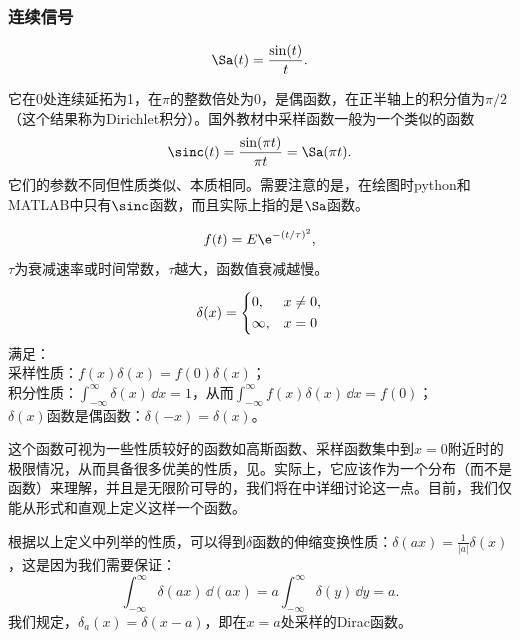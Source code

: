 \subsubsection{连续信号}
\begin{definition}[采样函数]\label{def:sinc}
    \begin{equation}
        \Sa(t)=\frac{\sin(t)}{t}.
    \end{equation}
\end{definition}
它在0处连续延拓为1，在$\pi$的整数倍处为0，是偶函数，在正半轴上的积分值为$\pi /2$（这个结果称为Dirichlet积分）。国外教材中采样函数一般为一个类似的函数
\begin{equation}
    \sinc(t)=\frac{\sin(\pi t)}{\pi t}=\Sa(\pi t).
\end{equation}
它们的参数不同但性质类似、本质相同。需要注意的是，在绘图时python和MATLAB中只有$\sinc$函数，而且实际上指的是$\Sa$函数。
\begin{definition}
    \begin{equation}
        f(t)=E\e^{-(t/\tau)^2},
    \end{equation}
    $\tau$为衰减速率或时间常数，$\tau$越大，函数值衰减越慢。
\end{definition}
\begin{definition}\label{def:delta}
    \begin{equation}
        \delta(x)=\begin{dcases}
            0,      & x\neq 0, \\
            \infty, & x=0
        \end{dcases}
    \end{equation}
    满足：\\
     采样性质：$f(x)\delta(x)=f(0)\delta(x)$；\\
     积分性质：$\int_{-\infty}^{\infty}\delta(x)\,\dd x=1$，从而$\int_{-\infty}^{\infty}f(x)\delta(x)\,\dd x=f(0)$；\\
     $\delta(x)$函数是偶函数：$\delta(-x)=\delta(x)$。
\end{definition}
这个函数可视为一些性质较好的函数如高斯函数、采样函数集中到$x=0$附近时的极限情况，从而具备很多优美的性质，见。实际上，它应该作为一个分布（而不是函数）来理解，并且是无限阶可导的，我们将在中详细讨论这一点。目前，我们仅能从形式和直观上定义这样一个函数。

根据以上定义中列举的性质，可以得到$\delta$函数的伸缩变换性质：$\displaystyle \delta(ax)=\frac{1}{|a|}\delta(x)$，这是因为我们需要保证：
\begin{equation}
    \int_{-\infty}^{\infty}\delta(ax)\,\dd(ax)=a\int_{-\infty}^{\infty}\delta(y)\,\dd y=a.
\end{equation}
我们规定，$\delta_a(x)=\delta(x-a)$，即在$x=a$处采样的Dirac函数。

